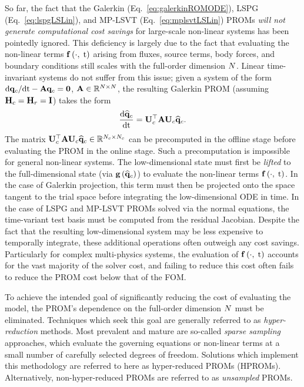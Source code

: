 So far, the fact that the Galerkin (Eq.~\ref{eq:galerkinROMODE}), LSPG (Eq.~\ref{eq:lspgLSLin}), and MP-LSVT (Eq.~\ref{eq:mplsvtLSLin}) PROMs \textit{will not generate computational cost savings} for large-scale non-linear systems has been pointedly ignored. This deficiency is largely due to the fact that evaluating the non-linear terms $\mathbf{f} \left(\cdot, \; \text{t}\right)$ arising from fluxes, source terms, body forces, and boundary conditions still scales with the full-order dimension $N$. Linear time-invariant systems do not suffer from this issue; given a system of the form $\text{d}\mathbf{q}_{c}/\text{d}\text{t} - \mathbf{A} \mathbf{q}_{c} = \mathbf{0}$, $\mathbf{A} \in \mathbb{R}^{N \times N}$, the resulting Galerkin PROM (assuming $\consScale = \resScale = \identMat$) takes the form
%
\begin{equation}
    \ode{\consVecCoef}{\timeVar} = \consTrial^\top \dummyMat \consTrial \consVecCoef.
\end{equation}
%
The matrix $\consTrial^\top \dummyMat \consTrial \consVecCoef \inRTwo{\numConsModes}{\numConsModes}$ can be precomputed in the offline stage before evaluating the PROM in the online stage. Such a precomputation is impossible for general non-linear systems. The low-dimensional state must first be \textit{lifted} to the full-dimensional state (via $\mathbf{g} \left(\mathbf{\widehat{q}}_{c}\right)$) to evaluate the non-linear terms $\mathbf{f} \left(\cdot, \; \text{t}\right)$. In the case of Galerkin projection, this term must then be projected onto the space tangent to the trial space before integrating the low-dimensional ODE in time. In the case of LSPG and MP-LSVT PROMs solved via the normal equations, the time-variant test basis must be computed from the residual Jacobian. Despite the fact that the resulting low-dimensional system may be less expensive to temporally integrate, these additional operations often outweigh any cost savings. Particularly for complex multi-physics systems, the evaluation of $\mathbf{f} \left(\cdot, \; \text{t}\right)$ accounts for the vast majority of the solver cost, and failing to reduce this cost often fails to reduce the PROM cost below that of the FOM.

To achieve the intended goal of significantly reducing the cost of evaluating the model, the PROM's dependence on the full-order dimension $N$ must be eliminated. Techniques which seek this goal are generally referred to as \textit{hyper-reduction} methods. Most prevalent and mature are so-called \textit{sparse sampling} approaches, which evaluate the governing equations or non-linear terms at a small number of carefully selected degrees of freedom. Solutions which implement this methodology are referred to here as hyper-reduced PROMs (HPROMs). Alternatively, non-hyper-reduced PROMs are referred to as \textit{unsampled} PROMs.

